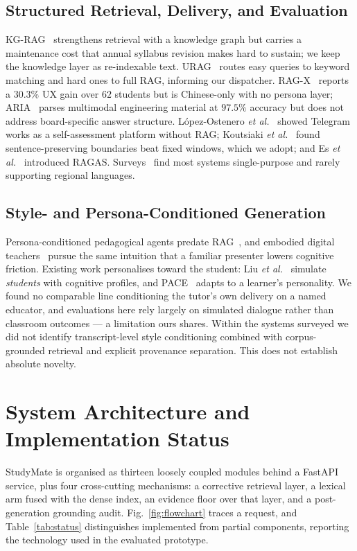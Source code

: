 \documentclass[conference]{IEEEtran}
\begin{document}
\subsection{Structured Retrieval, Delivery, and Evaluation}
KG-RAG~\cite{dong2025} strengthens retrieval with a knowledge graph but carries
a maintenance cost that annual syllabus revision makes hard to sustain; we keep
the knowledge layer as re-indexable text. URAG~\cite{nguyen2025} routes easy
queries to keyword matching and hard ones to full RAG, informing our
dispatcher. RAG-X~\cite{he2025} reports a $30.3\%$ UX gain over $62$ students
but is Chinese-only with no persona layer; ARIA~\cite{luo2026} parses
multimodal engineering material at $97.5\%$ accuracy but does not address
board-specific answer structure. L\'opez-Ostenero \textit{et
al.}~\cite{gielis2025} showed Telegram works as a self-assessment platform
without RAG; Koutsiaki \textit{et al.}~\cite{koutsiaki2025} found
sentence-preserving boundaries beat fixed windows, which we adopt; and Es
\textit{et al.}~\cite{es2025} introduced RAGAS. Surveys~\cite{kuhail2023,
wollny2021} find most systems single-purpose and rarely supporting regional
languages.

\subsection{Style- and Persona-Conditioned Generation}
Persona-conditioned pedagogical agents predate
RAG~\cite{liu2024persona,liu2025pace}, and embodied digital
teachers~\cite{zhao2024} pursue the same intuition that a familiar presenter
lowers cognitive friction. Existing work personalises toward the student: Liu
\textit{et al.}~\cite{liu2024persona} simulate \emph{students} with cognitive
profiles, and PACE~\cite{liu2025pace} adapts to a learner's personality. We
found no comparable line conditioning the tutor's own delivery on a named
educator, and evaluations here rely largely on simulated dialogue rather than
classroom outcomes --- a limitation ours shares. Within the systems surveyed we
did not identify transcript-level style conditioning combined with
corpus-grounded retrieval and explicit provenance separation. This does not
establish absolute novelty.

\section{System Architecture and Implementation Status}
StudyMate is organised as thirteen loosely coupled modules behind a FastAPI
service, plus four cross-cutting mechanisms: a corrective retrieval layer, a
lexical arm fused with the dense index, an evidence floor over that layer, and
a post-generation grounding audit. Fig.~\ref{fig:flowchart} traces a request,
and Table~\ref{tab:status} distinguishes implemented from partial components,
reporting the technology used in the evaluated prototype.
\end{document}
